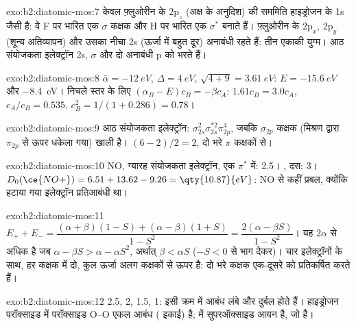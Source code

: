 \begin{solution}{exo:b2:diatomic-mos:7}
केवल फ़्लुओरीन के $2\mathrm p_z$ (अक्ष के अनुदिश) की सममिति हाइड्रोजन के 1s जैसी है:
वे F पर भारित एक $\sigma$ कक्षक और H पर भारित एक $\sigma^*$ बनाते हैं। फ़्लुओरीन के
$2\mathrm p_x$, $2\mathrm p_y$ (शून्य अतिव्यापन) और उसका नीचा 2s (ऊर्जा में बहुत दूर)
अनाबंधी रहते हैं: तीन एकाकी युग्म। आठ संयोजकता इलेक्ट्रॉन 2s, $\sigma$
और दो अनाबंधी p को भरते हैं।
\end{solution}

\begin{solution}{exo:b2:diatomic-mos:8}
$\bar\alpha = \qty{-12}{eV}$, $\Delta = \qty{4}{eV}$, $\sqrt{4 + 9} = \qty{3.61}{eV}$:
$E = \qty{-15.6}{eV}$ और \qty{-8.4}{eV}। निचले स्तर के लिए $(\alpha_B - E)c_B = -\beta
c_A$: $1.61c_B = 3.0c_A$, $c_A/c_B = 0.535$, $c_B^2 = 1/(1 + 0.286) = 0.78$।
\end{solution}

\begin{solution}{exo:b2:diatomic-mos:9}
आठ संयोजकता इलेक्ट्रॉन: $\sigma_{2s}^2\sigma_{2s}^{*2}\pi_{2p}^4$, जबकि $\sigma_{2p}$ कक्षक
(मिश्रण द्वारा $\pi_{2p}$ से ऊपर धकेला गया) खाली है।  $(6 - 2)/2 = 2$, दो
भरे $\pi$ कक्षकों से।
\end{solution}

\begin{solution}{exo:b2:diatomic-mos:10}
NO, ग्यारह संयोजकता इलेक्ट्रॉन, एक $\pi^*$ में:  2.5। , दस: 
3। $D_0(\ce{NO+}) = 6.51 + 13.62 - 9.26 = \qty{10.87}{eV}$: NO से कहीं प्रबल, क्योंकि
हटाया गया इलेक्ट्रॉन प्रतिआबंधी था।
\end{solution}

\begin{solution}{exo:b2:diatomic-mos:11}
$E_+ + E_- = \dfrac{(\alpha + \beta)(1 - S) + (\alpha - \beta)(1 + S)}{1 - S^2} = \dfrac{2(\alpha -
\beta S)}{1 - S^2}$। यह $2\alpha$ से अधिक है जब $\alpha - \beta S > \alpha - \alpha S^2$, अर्थात्
$\beta < \alpha S$ ($-S < 0$ से भाग देकर)। चार इलेक्ट्रॉनों के साथ, हर कक्षक में दो,
कुल ऊर्जा अलग कक्षकों से ऊपर है: दो भरे कक्षक एक-दूसरे को प्रतिकर्षित करते हैं।
\end{solution}

\begin{solution}{exo:b2:diatomic-mos:12}
 2.5, 2, 1.5, 1: इसी क्रम में आबंध लंबे और दुर्बल होते हैं। हाइड्रोजन
परॉक्साइड में परॉक्साइड O--O एकल आबंध ( इकाई) है;  में
सुपरऑक्साइड आयन  है, जो  है।
\end{solution}

